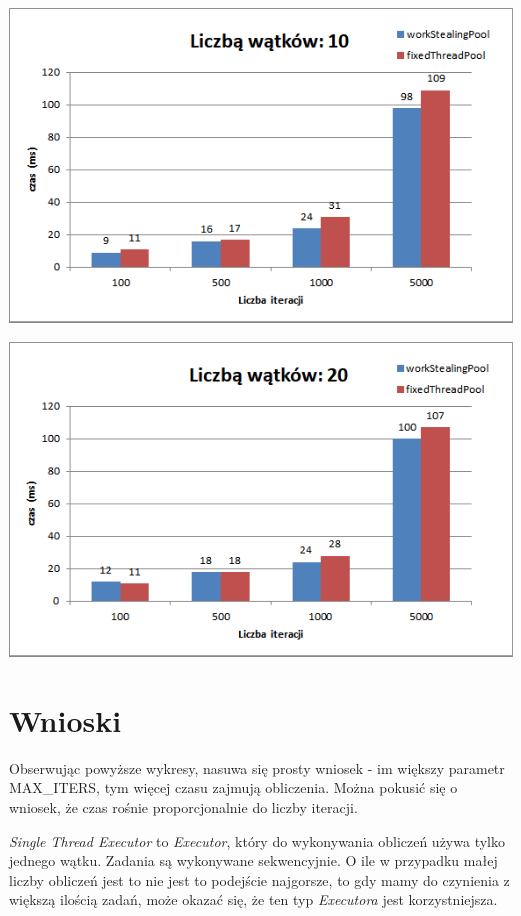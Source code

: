 \documentclass[12pt]{article}
\begin{document}
\begin{center}
\centering
    \includegraphics{compare3.png}
\end{center}

\begin{center}
\centering
    \includegraphics{compare4.png}
\end{center}

\section{Wnioski}
Obserwując powyższe wykresy, nasuwa się prosty wniosek - im większy parametr MAX\_ITERS, tym więcej czasu zajmują obliczenia. Można pokusić się o wniosek, że czas rośnie proporcjonalnie do liczby iteracji.

\medskip
\emph{Single Thread Executor} to \emph{Executor}, który do wykonywania obliczeń używa tylko jednego wątku. Zadania są wykonywane sekwencyjnie. O ile w przypadku małej liczby obliczeń jest to nie jest to podejście najgorsze, to gdy mamy do czynienia z większą ilością zadań, może okazać się, że ten typ \emph{Executora} jest korzystniejsza.
\end{document}
